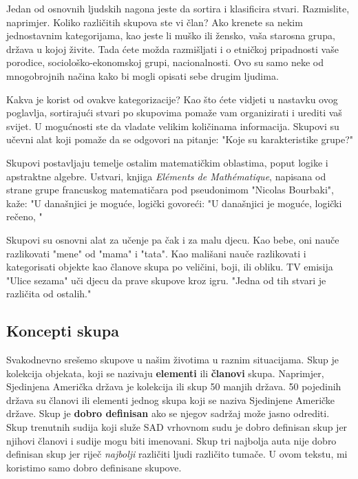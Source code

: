 \documentclass[a4paper, 14pt]{article}
\begin{document}
\bigskip\bigskip
\begin{Large}
Jedan od osnovnih ljudskih nagona jeste da sortira i klasificira stvari. Razmislite, naprimjer. Koliko različitih skupova ste vi član? Ako krenete sa nekim jednostavnim kategorijama, kao jeste li muško ili žensko, vaša starosna grupa, država u kojoj živite. Tada ćete možda razmišljati i o etničkoj pripadnosti vaše porodice, sociološko-ekonomskoj grupi, nacionalnosti. Ovo su samo neke od mnogobrojnih načina kako bi mogli opisati sebe drugim ljudima.

Kakva je korist od ovakve kategorizacije? Kao što ćete vidjeti u nastavku ovog poglavlja, sortirajući stvari po skupovima pomaže vam organizirati i urediti vaš svijet. U mogućnosti ste da vladate velikim količinama informacija. Skupovi su učevni alat koji pomaže da se odgovori na pitanje: "Koje su karakteristike grupe?"

Skupovi postavljaju temelje ostalim matematičkim oblastima, poput logike i apstraktne algebre. Ustvari, knjiga \textit{El\' ements de Math\' ematique}, napisana od strane grupe francuskog matematičara pod pseudonimom "Nicolas Bourbaki", kaže: "U današnjici je moguće, logički govoreći: "U današnjici je moguće, logički rečeno, "

\vfill
\begin{tcolorbox}
Skupovi su osnovni alat za učenje pa čak i za malu djecu. Kao bebe, oni nauče razlikovati "mene" od "mama" i "tata". Kao mališani nauče razlikovati i kategorisati objekte kao članove skupa po veličini, boji, ili obliku. TV emisija "Ulice sezama" uči djecu da prave skupove kroz igru. "Jedna od tih stvari je različita od ostalih."
\end{tcolorbox}
\end{Large}

\newpage
\subsection{Koncepti skupa}

Svakodnevno srešemo skupove u našim životima u raznim situacijama. Skup je kolekcija objekata, koji se nazivaju \textbf{elementi} ili \textbf{članovi} skupa. Naprimjer, Sjedinjena Američka država je kolekcija ili skup 50 manjih država. 50 pojedinih država su članovi ili elementi jednog skupa koji se naziva Sjedinjene Američke države.
Skup je \textbf{dobro definisan} ako se njegov sadržaj može jasno odrediti. Skup trenutnih sudija koji služe SAD vrhovnom sudu je dobro definisan skup jer njihovi članovi i sudije mogu biti imenovani. Skup tri najbolja auta nije dobro definisan skup jer riječ \textit{najbolji} različiti ljudi različito tumače. U ovom tekstu, mi koristimo samo dobro definisane skupove.
\end{document}
